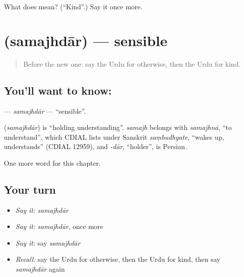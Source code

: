 \begin{tcolorbox}[breakable,colback=teal!4,colframe=teal!35!black,title={Before you move on}]
What does  mean? (\textquotedblleft{}Kind\textquotedblright{}.) Say it once more.
\end{tcolorbox}
\section[\texorpdfstring{\ur{سمجھدار} (samajhdār)}{سمجھدار (samajhdār)}]{ (samajhdār) — sensible}

\label{lesson:UR-C160-samajhdar}



\begin{quote}
Before the new one: say the Urdu for otherwise, then the Urdu for kind.
\end{quote}

\subsection*{You'll want to know: }
\textbf{} — \emph{samajhdār} — \textquotedblleft{}sensible\textquotedblright{}.

\begin{cousinweb}
\textbf{} (\emph{samajhdār}) is \textquotedblleft{}holding understanding\textquotedblright{}. \emph{samajh} belongs with \emph{samajhnā}, \textquotedblleft{}to understand\textquotedblright{}, which CDIAL lists under Sanskrit \emph{saṃbudhyate}, \textquotedblleft{}wakes up, understands\textquotedblright{} (CDIAL 12959), and \emph{-dār}, \textquotedblleft{}holder\textquotedblright{}, is Persian.
\end{cousinweb}

\begin{grammarlens}[title={What you've built}]
One more word for this chapter.
\end{grammarlens}

\subsection*{Your turn}
\begin{itemize}
\raggedright
  \item \emph{Say it:} \emph{samajhdār}
  \item \emph{Say it:} \emph{samajhdār}, once more
  \item \emph{Say it:} say \emph{samajhdār}
  \item \emph{Recall:} say the Urdu for otherwise, then the Urdu for kind, then say \emph{samajhdār} again
\end{itemize}

